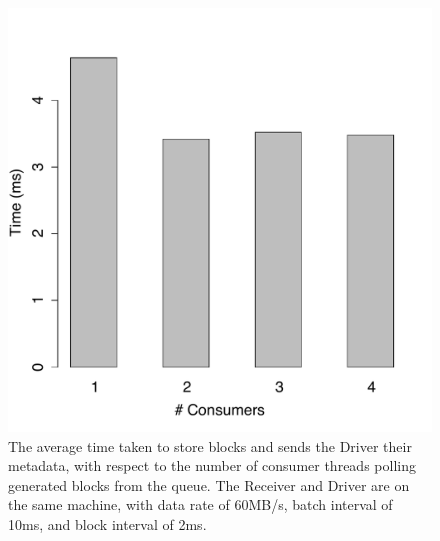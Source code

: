 \begin{figure}[t!]
 \begin{center}
   \includegraphics[scale=0.40]{images_graphs/optimizations/graph4/consumers_optimization_illus.pdf}
 \end{center}
 \caption{The average time taken to store blocks and sends the Driver their metadata, with respect to the number of consumer threads polling generated blocks from the queue. The Receiver and Driver are on the same machine, with data rate of 60MB/s, batch interval of 10ms, and block interval of 2ms.}
 \label{fig:consumers_optimization_illus}
\end{figure}
